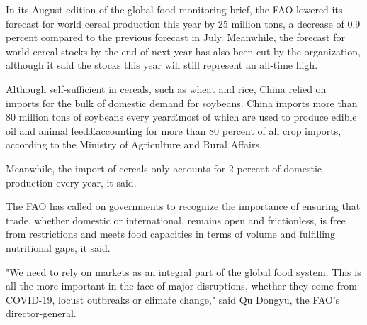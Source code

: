 \documentclass[a4paper]{article}
\begin{document}
In its August edition of the global food monitoring brief, the FAO lowered its forecast for world cereal production this year by 25 million tons, a decrease of 0.9 percent compared to the previous forecast in July. Meanwhile, the forecast for world cereal stocks by the end of next year has also been cut by the organization, although it said the stocks this year will still represent an all-time high.

Although self-sufficient in cereals, such as wheat and rice, China relied on imports for the bulk of domestic demand for soybeans. China imports more than 80 million tons of soybeans every year£­most of which are used to produce edible oil and animal feed£­accounting for more than 80 percent of all crop imports, according to the Ministry of Agriculture and Rural Affairs.

Meanwhile, the import of cereals only accounts for 2 percent of domestic production every year, it said.

The FAO has called on governments to recognize the importance of ensuring that trade, whether domestic or international, remains open and frictionless, is free from restrictions and meets food capacities in terms of volume and fulfilling nutritional gaps, it said.

"We need to rely on markets as an integral part of the global food system. This is all the more important in the face of major disruptions, whether they come from COVID-19, locust outbreaks or climate change," said Qu Dongyu, the FAO's director-general.

\printindex
\end{document}
